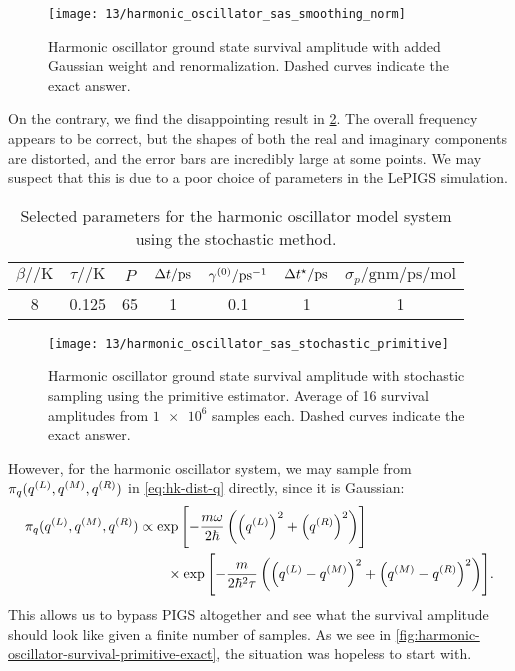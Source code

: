 \begin{figure}
	\centering
	\texttt{[image: 13/harmonic\_oscillator\_sas\_smoothing\_norm]}
	\caption[
		Harmonic oscillator survival amplitude with added Gaussian weight
	]{
		Harmonic oscillator ground state survival amplitude with added Gaussian weight and renormalization.
		Dashed curves indicate the exact answer.
	}
	\label{fig:harmonic-oscillator-survival-smoothing-norm}
\end{figure}

On the contrary, we find the disappointing result in \cref{fig:harmonic-oscillator-survival-primitive}.
The overall frequency appears to be correct, but the shapes of both the real and imaginary components are distorted, and the error bars are incredibly large at some points.
We may suspect that this is due to a poor choice of parameters in the LePIGS simulation.

\begin{table}
	\begin{center}
	\begin{tabular}{ c c c c c c c }
		\toprule
		{$\beta / \si{\per\kelvin}$} & {$\tau / \si{\per\kelvin}$} & {$P$} & {$\dt / \si{\pico\second}$} & $\gamma\bead{0} / \si{\per\pico\second}$ & {$\dt\alt / \si{\pico\second}$} & {$\sigma_p / \si{\gram\nano\meter\per\pico\second\per\mole}$} \\
		\midrule
		8 & 0.125 & 65 & 1 & 0.1 & 1 & 1 \\
		\bottomrule
	\end{tabular}
	\end{center}
	\caption[
		Selected parameters for harmonic oscillator (stochastic)
	]{
		Selected parameters for the harmonic oscillator model system using the stochastic method.
	}
	\label{tab:model-sas-harmonic-oscillator-stochastic}
\end{table}

\begin{figure}
	\centering
	\texttt{[image: 13/harmonic\_oscillator\_sas\_stochastic\_primitive]}
	\caption[
		Harmonic oscillator survival amplitude using primitive estimator
	]{
		Harmonic oscillator ground state survival amplitude with stochastic sampling using the primitive estimator.
		Average of 16 survival amplitudes from $\num{1e6}$ samples each.
		Dashed curves indicate the exact answer.
	}
	\label{fig:harmonic-oscillator-survival-primitive}
\end{figure}

However, for the harmonic oscillator system, we may sample from $\pi_q(q^{(L)}, q^{(M)}, q^{(R)})$ in \cref{eq:hk-dist-q} directly, since it is Gaussian:
\begin{align}
	\pi_q(q^{(L)}, q^{(M)}, q^{(R)})
	&\propto \exp{\left[ 
			-\frac{m \omega}{2 \hbar} \left( \left( q^{(L)}\right)^2 + \left( q^{(R)}\right)^2 \right)
		 \right]} \notag \\
	&\qquad\times
		\exp{\left[ 
			-\frac{m}{2 \hbar^2 \tau} \left( \left( q^{(L)}- q^{(M)}\right)^2 + \left( q^{(M)}- q^{(R)}\right)^2 \right)
		 \right]}.
\end{align}
This allows us to bypass PIGS altogether and see what the survival amplitude should look like given a finite number of samples.
As we see in \cref{fig:harmonic-oscillator-survival-primitive-exact}, the situation was hopeless to start with.

